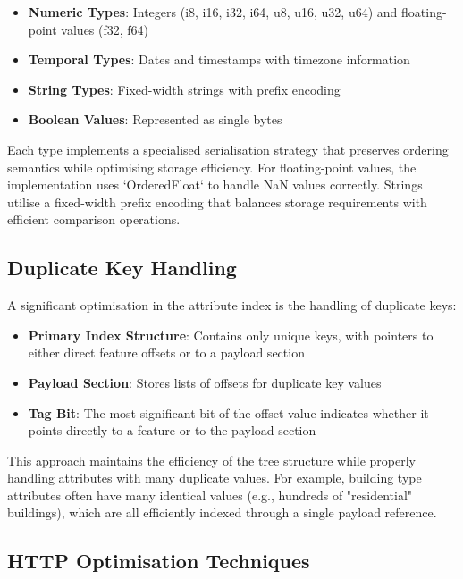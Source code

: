 \begin{itemize}
    \item \textbf{Numeric Types}: Integers (i8, i16, i32, i64, u8, u16, u32, u64) and floating-point values (f32, f64)
    \item \textbf{Temporal Types}: Dates and timestamps with timezone information
    \item \textbf{String Types}: Fixed-width strings with prefix encoding
    \item \textbf{Boolean Values}: Represented as single bytes
\end{itemize}

Each type implements a specialised serialisation strategy that preserves ordering semantics while optimising storage efficiency. For floating-point values, the implementation uses `OrderedFloat` to handle NaN values correctly. Strings utilise a fixed-width prefix encoding that balances storage requirements with efficient comparison operations.

\subsection{Duplicate Key Handling}
\label{methodology:attribute_index:duplicate_key_handling}

A significant optimisation in the attribute index is the handling of duplicate keys:

\begin{itemize}
    \item \textbf{Primary Index Structure}: Contains only unique keys, with pointers to either direct feature offsets or to a payload section
    \item \textbf{Payload Section}: Stores lists of offsets for duplicate key values
    \item \textbf{Tag Bit}: The most significant bit of the offset value indicates whether it points directly to a feature or to the payload section
\end{itemize}

This approach maintains the efficiency of the tree structure while properly handling attributes with many duplicate values. For example, building type attributes often have many identical values (e.g., hundreds of "residential" buildings), which are all efficiently indexed through a single payload reference.

\subsection{HTTP Optimisation Techniques}
\label{methodology:attribute_index:http_optimisation}

